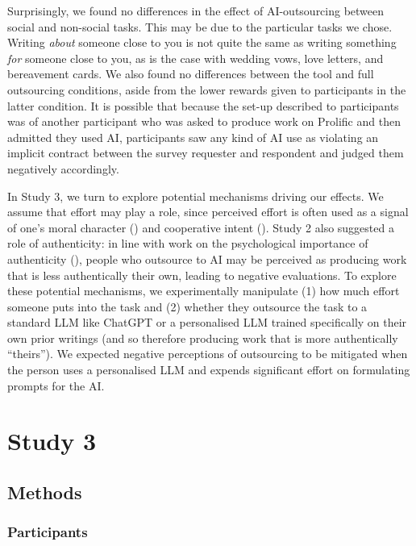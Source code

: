 \documentclass[
  man,
  floatsintext,
  longtable,
  nolmodern,
  notxfonts,
  notimes,
  colorlinks=true,linkcolor=blue,citecolor=blue,urlcolor=blue]{apa7}
\begin{document}
Surprisingly, we found no differences in the effect of AI-outsourcing
between social and non-social tasks. This may be due to the particular
tasks we chose. Writing \emph{about} someone close to you is not quite
the same as writing something \emph{for} someone close to you, as is the
case with wedding vows, love letters, and bereavement cards. We also
found no differences between the tool and full outsourcing conditions,
aside from the lower rewards given to participants in the latter
condition. It is possible that because the set-up described to
participants was of another participant who was asked to produce work on
Prolific and then admitted they used AI, participants saw any kind of AI
use as violating an implicit contract between the survey requester and
respondent and judged them negatively accordingly.

In Study 3, we turn to explore potential mechanisms driving our effects.
We assume that effort may play a role, since perceived effort is often
used as a signal of one's moral character
() and cooperative intent
(). Study 2 also
suggested a role of authenticity: in line with work on the psychological
importance of authenticity (),
people who outsource to AI may be perceived as producing work that is
less authentically their own, leading to negative evaluations. To
explore these potential mechanisms, we experimentally manipulate (1) how
much effort someone puts into the task and (2) whether they outsource
the task to a standard LLM like ChatGPT or a personalised LLM trained
specifically on their own prior writings (and so therefore producing
work that is more authentically ``theirs''). We expected negative
perceptions of outsourcing to be mitigated when the person uses a
personalised LLM and expends significant effort on formulating prompts
for the AI.

\section*{Study 3}\label{study-3}

\subsection*{Methods}\label{methods-2}

\subsubsection*{Participants}\label{participants-2}
\end{document}
